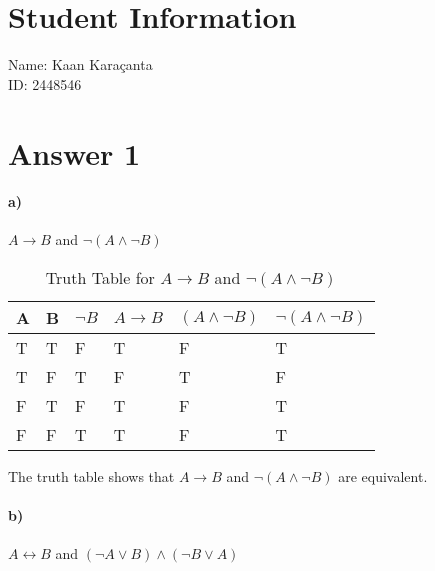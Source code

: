\documentclass[12pt]{article}
\begin{document}
\section*{Student Information}

Name: Kaan Karaçanta \\

ID: 2448546 \\


\section*{Answer 1}

\paragraph{a)} $ A \rightarrow B $ and $ \neg (A \wedge \neg B) $

\begin{table}[H]
    \centering
    \begin{tabular}{|l|l|l|l|l|l|}
        \hline
        A & B & $\neg B$ & $ A \rightarrow B $ & $ (A \wedge \neg B) $ & $ \neg (A \wedge \neg B) $ \\ \hline
        T & T & F        & T                   & F                     & T                          \\ \hline
        T & F & T        & F                   & T                     & F                          \\ \hline
        F & T & F        & T                   & F                     & T                          \\ \hline
        F & F & T        & T                   & F                     & T                          \\ \hline
    \end{tabular}

    \caption{Truth Table for $ A \rightarrow B $ and $ \neg (A \wedge \neg B) $}
    \label{t1}
\end{table}

The truth table shows that $ A \rightarrow B $ and $ \neg (A \wedge \neg B) $ are equivalent.

\paragraph{b)} $ A \leftrightarrow B $ and $ (\neg A \vee B) \wedge (\neg B \vee A) $
\end{document}
